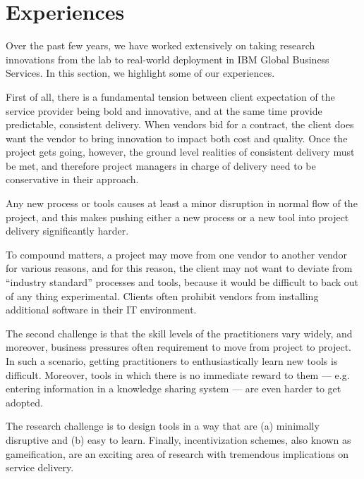 \section{Experiences}

Over the past few years, we have worked extensively on taking research innovations from the lab to real-world deployment in IBM Global Business Services. In this section, we highlight some of our experiences.

First of all, there is a fundamental tension between client expectation of the service provider being bold and innovative, and at the same time provide predictable, consistent delivery.  When vendors bid for a contract, the client does want the vendor to bring innovation to impact both cost and quality. Once the project gets going, however, the ground level realities of consistent delivery must be met, and therefore project managers in charge of delivery need to be conservative in their approach.

Any new process or tools causes at least a minor disruption in normal flow of the project, and this makes pushing either a new process or a new tool into project delivery significantly harder.  

To compound matters, a project may move from one vendor to another vendor for various reasons, and for this reason, the client may not want to deviate from ``industry standard'' processes and tools, because it would be difficult to back out of any thing experimental. Clients often prohibit vendors from installing additional software in their IT environment.

The second challenge is that the skill levels of the practitioners vary widely, and moreover, business pressures often requirement to move from project to project. In such a scenario, getting practitioners to enthusiastically learn new tools is difficult.  Moreover, tools in which there is no immediate reward to them --- e.g. entering information in a knowledge sharing system --- are even harder to get adopted.

The research challenge is to design tools in a way that are (a) minimally disruptive and (b) easy to learn. Finally, incentivization schemes, also known as gameification, are an exciting area of research with tremendous implications on service delivery.
